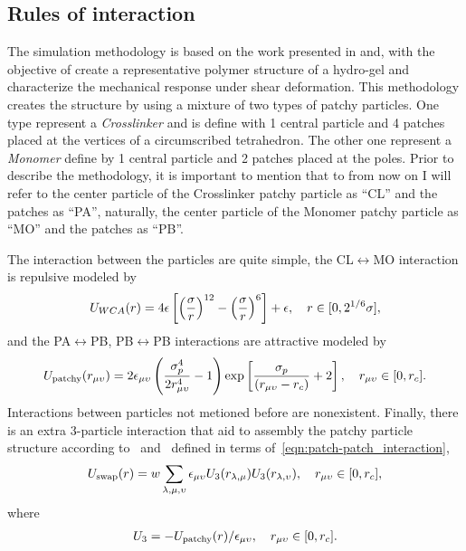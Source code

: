 \documentclass[../main.tex]{subfiles}
\begin{document}
\subsection{Rules of interaction}

The simulation methodology is based on the work presented in\citep{gnanSilicoSynthesisMicrogel2017} and\citep{sorichettiStructureElasticityModel2023}, with the objective of create a representative polymer structure of a hydro-gel and characterize the mechanical response under shear deformation.
This methodology creates the structure by using a mixture of two types of patchy particles.
One type represent a \textit{Crosslinker} and is define with 1 central particle and 4 patches placed at the vertices of a circumscribed tetrahedron. %
The other one represent a \textit{Monomer} define by 1 central particle and 2 patches placed at the poles.
Prior to describe the methodology, it is important to mention that to from now on I will refer to the center particle of the Crosslinker patchy particle as ``CL'' and the patches as ``PA'', naturally, the center particle of the Monomer patchy particle as ``MO'' and the patches as ``PB''.

The interaction between the particles are quite simple, the CL$\longleftrightarrow$MO interaction is repulsive modeled by 
\begin{gather}
    U_{WCA}(r) = 4\epsilon\left[\qty(\frac{\sigma}{r})^{12}-\qty(\frac{\sigma}{r})^6\right]+\epsilon,\quad r\in[0,2^{1/6}\sigma],\label{eqn:CL-MO_interaction}
\end{gather}
and the PA$\longleftrightarrow$PB, PB$\longleftrightarrow$PB interactions are attractive modeled by
\begin{gather}
    U_{\mathrm{patchy}}\qty(r_{\mu\upsilon}) = 2\epsilon_{\mu\upsilon}\left(\frac{\sigma_p^4}{2 r_{\mu\upsilon}^4}-1\right)\exp\left[\frac{\sigma_p}{\qty(r_{\mu\upsilon}-r_{c})}+2\right],\quad r_{\mu\upsilon}\in\qty[0,r_c]. \label{eqn:patch-patch_interaction}
\end{gather}
Interactions between particles not metioned before are nonexistent.
Finally, there is an extra 3-particle interaction that aid to assembly the patchy particle structure according to~\citep{sciortinoThreebodyPotentialSimulating2017} and~\citep{sorichettiStructureElasticityModel2023} defined in terms of~\eqref{eqn:patch-patch_interaction},
\begin{gather}
	U_{\mathrm{swap}}(r) = w\sum_{\lambda,\mu,\upsilon}\epsilon_{\mu\upsilon}U_3\qty(r_{\lambda,\mu})U_3\qty(r_{\lambda,\upsilon}),\quad r_{\mu\upsilon}\in\qty[0,r_c],\label{eqn:swap_interaction}
\end{gather}
where
\begin{gather}
    U_{3} = -U_{\mathrm{patchy}}\qty(r)/\epsilon_{\mu\upsilon},\quad r_{\mu\upsilon}\in\qty[0,r_c].\label{eqn:swapmod_interaction}
\end{gather}
\end{document}
